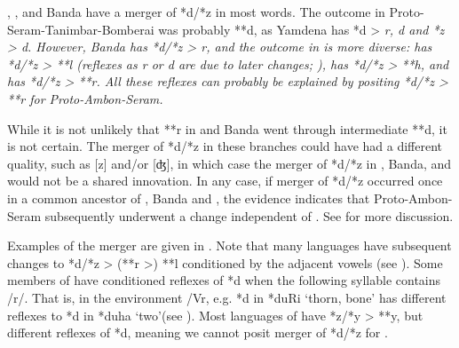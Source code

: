 , , and Banda have
a merger of *d/*z in most words.
The outcome in Proto-Seram-Tanimbar-Bomberai was
probably **d, as Yamdena has *d > \it{r,
d} and *z > \it{d}.
However, Banda has *d/*z > \it{r},
and the outcome in  is more diverse:  has *d/*z > **l (reflexes as \it{r} or \it{d} are due to later changes; ),
 has *d/*z > **h,
and  has *d/*z > **r.
All these  reflexes can probably be explained
by positing *d/*z > **r for Proto-Ambon-Seram.

While it is not unlikely that **r in 
and Banda went through intermediate **d,
it is not certain.
The merger of *d/*z in these branches could have
had a different quality,
such as [z] and/or [ʤ],
in which case the merger of *d/*z in ,
Banda, and  would not be a shared innovation.
In any case, if merger of *d/*z occurred once in a common ancestor
of , Banda and , the evidence indicates
that Proto-Ambon-Seram subsequently underwent a change independent of .
See  for more discussion.

Examples of the merger are given in .
Note that many  languages have subsequent
changes to *d/*z > (**r >) **l conditioned by the adjacent vowels (see ).
Some members of  have conditioned reflexes
of *d when the following syllable contains /r/.
That is, in the environment /{\gap}Vr, e.g.
*d in *duRi ‘thorn,
bone’ has different reflexes to *d in *duha ‘two’(see ).
Most languages of  have *z/*y > **y,
but different reflexes of *d,
meaning we cannot posit merger of *d/*z for .

